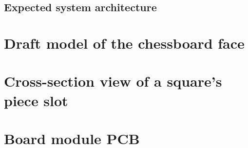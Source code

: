 \documentclass{article}
\begin{document}
\begin{appendices}
	\begin{landscape}
		\section{Expected system architecture}
		\begin{figure}[H]
			
		\end{figure}
	\end{landscape}

	\section{Draft model of the chessboard face}
	\section{Cross-section view of a square's piece slot}
	\section{Board module PCB}
\end{appendices}
\end{document}
